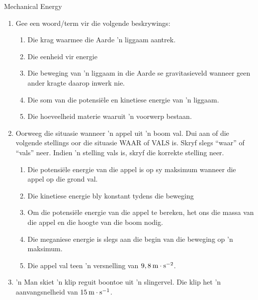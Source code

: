 \begin{eocexercises}{Mechanical Energy}
            \nopagebreak
      \label{m38786*id71520}\begin{enumerate}[noitemsep, label=\textbf{\arabic*}. ] 
            \label{m38786*uid118}\item Gee een woord/term vir die volgende beskrywings:
\label{m38786*id71536}\begin{enumerate}[noitemsep, label=\textbf{\alph*}. ] 
            \label{m38786*uid119}\item Die krag waarmee die Aarde   'n liggaam aantrek.
\label{m38786*uid120}\item Die eenheid vir energie
\label{m38786*uid121}\item Die beweging van   'n liggaam in die Aarde se gravitasieveld wanneer geen ander kragte daarop inwerk nie.
\label{m38786*uid122}\item Die som van die potensiële en kinetiese energie van   'n liggaam.
\label{m38786*uid123}\item Die hoeveelheid materie waaruit   'n voorwerp bestaan.
\end{enumerate}
                \label{m38786*uid124}\item Oorweeg die situasie wanneer   'n appel uit   'n boom val. Dui aan of die volgende stellings oor die situasie WAAR of VALS is. Skryf slegs “waar” of “vals” neer. Indien   'n stelling vals is, skryf die korrekte stelling neer.
\label{m38786*id71616}\begin{enumerate}[noitemsep, label=\textbf{\alph*}. ] 
            \label{m38786*uid125}\item Die potensiële energie van die appel is op sy maksimum wanneer die appel op die grond val.
\label{m38786*uid126}\item Die kinetiese energie bly konstant tydens die beweging
\label{m38786*uid127}\item Om die potensiële energie van die appel te bereken, het ons die massa van die appel en die hoogte van die boom nodig.
\label{m38786*uid128}\item Die meganiese energie is slegs aan die begin van die beweging op   'n maksimum.
\label{m38786*uid129}\item Die appel val teen   'n versnelling van $9,8\phantom{\rule{2pt}{0ex}}\text{m}\ensuremath{\cdot}\text{s}{}^{-2}$.
\end{enumerate}
                \label{m38786*uid131}\item   'n Man skiet   'n klip reguit boontoe uit   'n slingervel. Die klip het   'n aanvangsnelheid van  $15\phantom{\rule{2pt}{0ex}}\text{m}\ensuremath{\cdot}\text{s}{}^{-1}$.

\end{enumerate}
\end{eocexercises}
